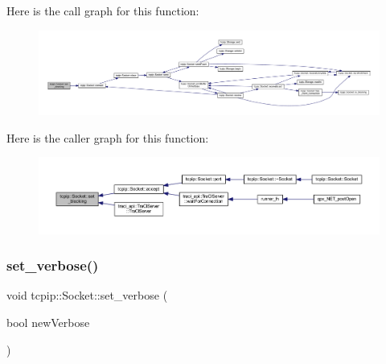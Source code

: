 Here is the call graph for this function\+:\nopagebreak
\begin{figure}[H]
\begin{center}
\leavevmode
\includegraphics[width=350pt]{classtcpip_1_1_socket_ac382abc174bd18e4a61354cd857470c8_cgraph}
\end{center}
\end{figure}
Here is the caller graph for this function\+:\nopagebreak
\begin{figure}[H]
\begin{center}
\leavevmode
\includegraphics[width=350pt]{classtcpip_1_1_socket_ac382abc174bd18e4a61354cd857470c8_icgraph}
\end{center}
\end{figure}
\mbox{\label{classtcpip_1_1_socket_a695b2054effe2dfc2eddb12b7032b723}} 
\subsubsection{\texorpdfstring{set\+\_\+verbose()}{set\_verbose()}}
{\footnotesize\ttfamily void tcpip\+::\+Socket\+::set\+\_\+verbose (\begin{DoxyParamCaption}\item[{bool}]{new\+Verbose }\end{DoxyParamCaption})\hspace{0.3cm}{\ttfamily [inline]}}

\mbox{\label{classtcpip_1_1_socket_a5633dda8e133b4eba9028b4e460b5587}} 
